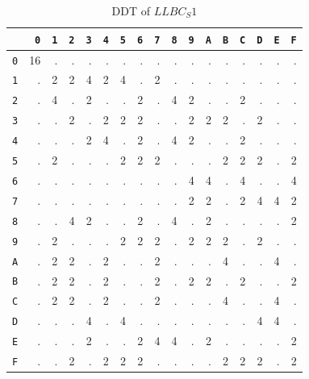 \begin{table}[t]
\centering
\caption{DDT of $LLBC_S1$}
\small
\begin{tabular}{r|rrrrrrrrrrrrrrrr}
 & \texttt{0} & \texttt{1} & \texttt{2} & \texttt{3} & \texttt{4} & \texttt{5} & \texttt{6} & \texttt{7} & \texttt{8} & \texttt{9} & \texttt{A} & \texttt{B} & \texttt{C} & \texttt{D} & \texttt{E} & \texttt{F} \\
\hline
\texttt{0} & 16 & . & . & . & . & . & . & . & . & . & . & . & . & . & . & . \\
\texttt{1} & . & 2 & 2 & 4 & 2 & 4 & . & 2 & . & . & . & . & . & . & . & . \\
\texttt{2} & . & 4 & . & 2 & . & . & 2 & . & 4 & 2 & . & . & 2 & . & . & . \\
\texttt{3} & . & . & 2 & . & 2 & 2 & 2 & . & . & 2 & 2 & 2 & . & 2 & . & . \\
\texttt{4} & . & . & . & 2 & 4 & . & 2 & . & 4 & 2 & . & . & 2 & . & . & . \\
\texttt{5} & . & 2 & . & . & . & 2 & 2 & 2 & . & . & . & 2 & 2 & 2 & . & 2 \\
\texttt{6} & . & . & . & . & . & . & . & . & . & 4 & 4 & . & 4 & . & . & 4 \\
\texttt{7} & . & . & . & . & . & . & . & . & . & 2 & 2 & . & 2 & 4 & 4 & 2 \\
\texttt{8} & . & . & 4 & 2 & . & . & 2 & . & 4 & . & 2 & . & . & . & . & 2 \\
\texttt{9} & . & 2 & . & . & . & 2 & 2 & 2 & . & 2 & 2 & 2 & . & 2 & . & . \\
\texttt{A} & . & 2 & 2 & . & 2 & . & . & 2 & . & . & . & 4 & . & . & 4 & . \\
\texttt{B} & . & 2 & 2 & . & 2 & . & . & 2 & . & 2 & 2 & . & 2 & . & . & 2 \\
\texttt{C} & . & 2 & 2 & . & 2 & . & . & 2 & . & . & . & 4 & . & . & 4 & . \\
\texttt{D} & . & . & . & 4 & . & 4 & . & . & . & . & . & . & . & 4 & 4 & . \\
\texttt{E} & . & . & . & 2 & . & . & 2 & 4 & 4 & . & 2 & . & . & . & . & 2 \\
\texttt{F} & . & . & 2 & . & 2 & 2 & 2 & . & . & . & . & 2 & 2 & 2 & . & 2 \\
\end{tabular}
\end{table}
